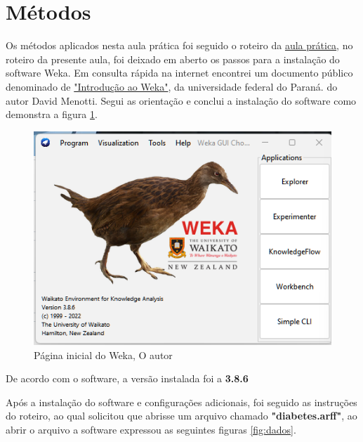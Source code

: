 \section{Métodos}
\par Os métodos aplicados nesta aula prática foi seguido o roteiro da \href{https://github.com/OgliariNatan/neuralPerceptron/blob/main/Aula%20pr%C3%A1tica.pdf}{aula prática}, no roteiro da presente aula, foi deixado em aberto os passos para a instalação do software Weka. Em consulta rápida na internet encontrei um documento público denominado de \href{https://github.com/OgliariNatan/neuralPerceptron/blob/main/ML-09weka.pdf}{"Introdução ao Weka"}, da universidade federal do Paraná. do autor David Menotti. Segui as orientação e conclui a instalação do software como demonstra a figura \ref{fig:home_weka}.
\begin{figure}[h]
  \center
  \includegraphics[scale=0.5]{figure/home_weka.png}
  \caption{Página inicial do Weka, O autor}\label{fig:home_weka}
\end{figure}
\par De acordo com o software, a versão instalada foi a \textbf{3.8.6}

\par Após a instalação do software e configurações adicionais, foi seguido as instruções do roteiro, ao qual solicitou que abrisse um arquivo chamado \textbf{"diabetes.arff"}, ao abrir o arquivo a software expressou as seguintes figuras \ref{fig:dados}.

